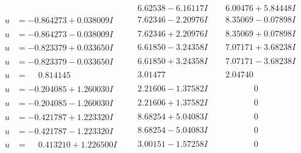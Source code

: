 \documentclass[1p]{elsarticle_modified}
\theoremstyle{definition}
\begin{document}
$$\begin{array}{c|c|c}
 & \phantom{-}6.62538 - 6.16117 I & \phantom{-}6.00476 + 5.84448 I \\ \hline\begin{aligned}
u &= -0.864273 + 0.038009 I\end{aligned}
 & \phantom{-}7.62346 - 2.20976 I & \phantom{-}8.35069 - 0.07898 I \\ \hline\begin{aligned}
u &= -0.864273 - 0.038009 I\end{aligned}
 & \phantom{-}7.62346 + 2.20976 I & \phantom{-}8.35069 + 0.07898 I \\ \hline\begin{aligned}
u &= -0.823379 + 0.033650 I\end{aligned}
 & \phantom{-}6.61850 - 3.24358 I & \phantom{-}7.07171 + 3.68238 I \\ \hline\begin{aligned}
u &= -0.823379 - 0.033650 I\end{aligned}
 & \phantom{-}6.61850 + 3.24358 I & \phantom{-}7.07171 - 3.68238 I \\ \hline\begin{aligned}
u &= \phantom{-}0.814145\phantom{ +0.000000I}\end{aligned}
 & \phantom{-}3.01477\phantom{ +0.000000I} & \phantom{-}2.04740\phantom{ +0.000000I} \\ \hline\begin{aligned}
u &= -0.204085 + 1.260030 I\end{aligned}
 & \phantom{-}2.21606 - 1.37582 I & \phantom{-0.000000 } 0 \\ \hline\begin{aligned}
u &= -0.204085 - 1.260030 I\end{aligned}
 & \phantom{-}2.21606 + 1.37582 I & \phantom{-0.000000 } 0 \\ \hline\begin{aligned}
u &= -0.421787 + 1.223320 I\end{aligned}
 & \phantom{-}8.68254 + 5.04083 I & \phantom{-0.000000 } 0 \\ \hline\begin{aligned}
u &= -0.421787 - 1.223320 I\end{aligned}
 & \phantom{-}8.68254 - 5.04083 I & \phantom{-0.000000 } 0 \\ \hline\begin{aligned}
u &= \phantom{-}0.413210 + 1.226500 I\end{aligned}
 & \phantom{-}3.00151 - 1.57258 I & \phantom{-0.000000 } 0 \\ \hline\begin{aligned}

\end{aligned}
\end{array}$$
\end{document}
